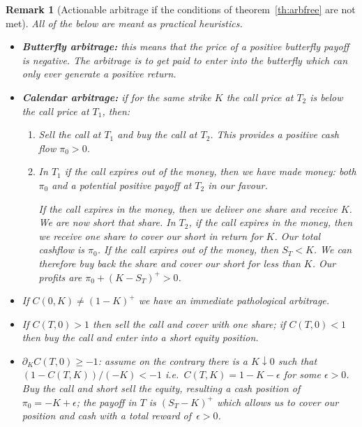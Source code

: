 \documentclass[11pt,a4paper]{article}
\newtheorem{remark}[definition]{Remark}
\begin{document}
\begin{remark}[Actionable arbitrage if the conditions of theorem~\ref{th:arbfree} are not met]\label{rem:actionable_arbitrage}
All of the below are meant as practical heuristics.
\begin{itemize}
    \item \textbf{Butterfly arbitrage:} this means that the price of a positive
    butterfly payoff is negative. The arbitrage is to get paid to enter into 
    the butterfly which can only ever generate a positive return.

    \item \textbf{Calendar arbitrage:} if for the same strike $K$ 
    the call price at $T_2$ is below the call price
    at $T_1$, then:
    \begin{enumerate}
        \item 
            Sell the call at $T_1$ and buy the call at $T_2$. This provides
            a positive cash flow $\pi_0>0$.
        \item 
            In $T_1$ if the call expires out of the money, then we have made money: both
            $\pi_0$ and a potential positive payoff at $T_2$ in our favour.

            If the call expires in the money, then we deliver one share
            and receive $K$. We are now short that share.
            In $T_2$, if the call expires in the money, then we receive one share
            to cover our short in return for $K$. Our total cashflow is $\pi_0$.
            If the call expires out of the money, then $S_T<K$. We can therefore
            buy back the share and cover our short for less than $K$.
            Our profits are $\pi_0+(K-S_T)^+>0$.
    \end{enumerate}
    \item If $C(0,K) \not= (1-K)^+$ we have an immediate pathological arbitrage.
    \item If $C(T,0)>1$ then sell the call and cover with one share; if $C(T,0)<1$
    then buy the call and enter into a short equity position.

    \item $\partial_K C(T,0)\geq -1$: assume on the contrary there is a $K\downarrow 0$
    such that $(1-C(T,K))/(-K) < -1$ i.e.~$C(T,K) = 1-K - \epsilon$ for some $\epsilon>0$.
          Buy the call and short sell the equity, resulting a cash position of $\pi_0=-K+\epsilon$;
          the payoff in $T$ is $(S_T-K)^+$ which allows us to cover our position and cash
          with a total reward of~$\epsilon>0$.


\end{itemize}
\end{remark}
\end{document}
